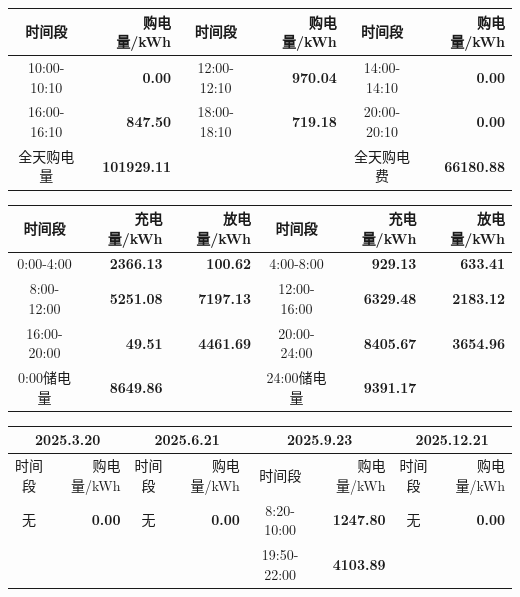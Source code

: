 {\begin{center}
\vspace{0.15\baselineskip}
\begin{tabular}{|c|r|c|r|c|r|}
\hline
时间段 & 购电量/kWh & 时间段 & 购电量/kWh & 时间段 & 购电量/kWh \\
\hline10:00-10:10 & \textbf{0.00} & 12:00-12:10 & \textbf{970.04} & 14:00-14:10 & \textbf{0.00} \\
\hline16:00-16:10 & \textbf{847.50} & 18:00-18:10 & \textbf{719.18} & 20:00-20:10 & \textbf{0.00} \\
\hline
全天购电量 & \textbf{101929.11} & & & 全天购电费 & \textbf{66180.88} \\
\hline
\end{tabular}
\par{}

\vspace{0.15\baselineskip}
\begin{tabular}{|c|r|r|c|r|r|}
\hline
时间段 & 充电量/kWh & 放电量/kWh & 时间段 & 充电量/kWh & 放电量/kWh \\
\hline0:00-4:00 & \textbf{2366.13} & \textbf{100.62} & 4:00-8:00 & \textbf{929.13} & \textbf{633.41} \\
\hline8:00-12:00 & \textbf{5251.08} & \textbf{7197.13} & 12:00-16:00 & \textbf{6329.48} & \textbf{2183.12} \\
\hline16:00-20:00 & \textbf{49.51} & \textbf{4461.69} & 20:00-24:00 & \textbf{8405.67} & \textbf{3654.96} \\
\hline0:00储电量 & \textbf{8649.86} & & 24:00储电量 & \textbf{9391.17} & \\
\hline
\end{tabular}
\par{}

\vspace{0.15\baselineskip}
\begin{tabular}{|c|r|c|r|c|r|c|r|}
\hline
\multicolumn{2}{c|}{2025.3.20} & \multicolumn{2}{c|}{2025.6.21} & \multicolumn{2}{c|}{2025.9.23} & \multicolumn{2}{c|}{2025.12.21} \\
\hline
时间段 & 购电量/kWh & 时间段 & 购电量/kWh & 时间段 & 购电量/kWh & 时间段 & 购电量/kWh \\
\hline
无 & \textbf{0.00} & 无 & \textbf{0.00} & 8:20-10:00 & \textbf{1247.80} & 无 & \textbf{0.00} \\
\hline
 &  &  &  & 19:50-22:00 & \textbf{4103.89} &  &  \\
\hline
\end{tabular}
\par{}

\end{center}
}
